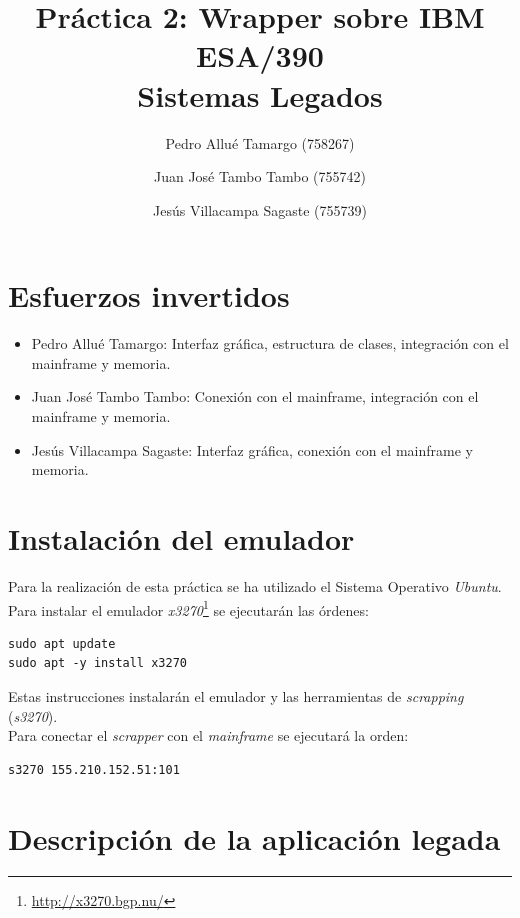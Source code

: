 \documentclass[10pt,a4paper]{article}
\begin{document}
\begin{titlepage}
\title{
	\textbf{
		{\Huge Práctica 2: Wrapper sobre IBM ESA/390}\\
		{\large Sistemas Legados}
	}
}
\author{
	Pedro Allué Tamargo (758267)
	\and
	Juan José Tambo Tambo (755742)
	\and
	Jesús Villacampa Sagaste (755739)
}
\clearpage\maketitle
\thispagestyle{empty}
\tableofcontents
\end{titlepage}

\section{Esfuerzos invertidos}

\begin{itemize}
\item Pedro Allué Tamargo: Interfaz gráfica, estructura de clases, integración con el mainframe y memoria.
\item Juan José Tambo Tambo: Conexión con el mainframe, integración con el mainframe y memoria.
\item Jesús Villacampa Sagaste: Interfaz gráfica, conexión con el mainframe y memoria.
\end{itemize}

\section{Instalación del emulador}

Para la realización de esta práctica se ha utilizado el Sistema Operativo \emph{Ubuntu}. Para instalar el emulador \emph{x3270}\footnote{\url{http://x3270.bgp.nu/}} se ejecutarán las órdenes:

\begin{lstlisting}
sudo apt update
sudo apt -y install x3270
\end{lstlisting}

Estas instrucciones instalarán el emulador y las herramientas de \emph{scrapping} (\emph{s3270}).\\

Para conectar el \emph{scrapper} con el \emph{mainframe} se ejecutará la orden:

\begin{lstlisting}
s3270 155.210.152.51:101
\end{lstlisting}


\section{Descripción de la aplicación legada}
\end{document}
